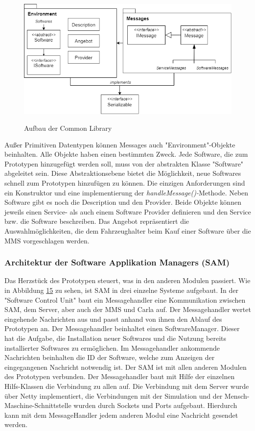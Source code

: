 \begin{figure}[!h]
	\centering
	\includegraphics[width=0.8\columnwidth]{pictures/konzept-Common.png}
	\label{img:common}
	\caption{Aufbau der Common Library}
\end{figure}

Außer Primitiven Datentypen können Messages auch "Environment"-Objekte beinhalten. Alle Objekte haben einen bestimmten Zweck. Jede Software, die zum Prototypen hinzugefügt werden soll, muss von der abstrakten Klasse "Software" abgeleitet sein. Diese Abstraktionsebene bietet die Möglichkeit, neue Softwares schnell zum Prototypen hinzufügen zu können. Die einzigen Anforderungen sind ein Konstruktor und eine implementierung der \textit{handleMessage()-}Methode. Neben Software gibt es noch die Description und den Provider. Beide Objekte können jeweils einen Service- als auch einem Software Provider definieren und den Service bzw. die Software beschreiben. Das Angebot repräsentiert die Auswahlmöglichkeiten, die dem Fahrzeughalter beim Kauf einer Software über die MMS vorgeschlagen werden.
\subsubsection{Architektur der Software Applikation Managers (SAM)}
Das Herzstück des Prototypen steuert, was in den anderen Modulen passiert. Wie in Abbildung \hyperref[img:sam]{15} zu sehen, ist SAM in drei einzelne Systeme aufgebaut. In der "Software Control Unit" baut ein Messagehandler eine Kommunikation zwischen SAM, dem Server, aber auch der MMS und Carla auf. Der Messagehandler wertet eingehende Nachrichten aus und passt anhand von ihnen den Ablauf des Prototypen an. Der Messagehandler beinhaltet einen SoftwareManager. Dieser hat die Aufgabe, die Installation neuer Softwares und die Nutzung bereits installierter Softwares zu ermöglichen. Im Messagehandler ankommende Nachrichten beinhalten die ID der Software, welche zum Anzeigen der eingegangenen Nachricht notwendig ist. Der SAM ist mit allen anderen Modulen des Prototypen verbunden. Der Messagehandler baut mit Hilfe der einzelnen Hilfs-Klassen die Verbindung zu allen auf. Die Verbindung mit dem Server wurde über Netty implementiert, die Verbindungen mit der Simulation und der Mensch-Maschine-Schnittstelle wurden durch Sockets und Ports aufgebaut. Hierdurch kann mit dem MessageHandler jedem anderen Modul eine Nachricht gesendet werden.\\

